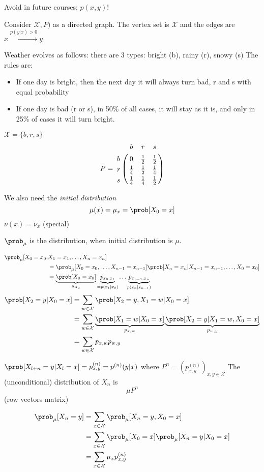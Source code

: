 \documentclass[mfit.tex]{subfiles}
\begin{document}
\begin{rem}
  Avoid in future courses: $p(x,y)$!
\end{rem}

Consider $\mathcal{X},P)$ as a directed graph. The vertex set is $\mathcal{X}$ and the edges are $x \overset{p(y|x)>0}{\to} y$

\begin{ex}
  Weather evolves as follows:
  there are 3 types: bright (b), rainy (r), snowy (s)
  The rules are:
  \begin{itemize}
    \item If one day is bright, then the next day it will always turn bad, r and s with equal probability
    \item If one day is bad (r or s), in 50\% of all cases, it will stay as it is, and only in 25\% of cases it will turn bright.
  \end{itemize}
  $\mathcal{X} = \{b,r,s\}$
  \begin{align*}
    P = 
    \bordermatrix{
    ~ & b & r & s \cr
    b & 0 & \frac{1}{2} & \frac{1}{2} \cr 
    r & \frac{1}{4} & \frac{1}{2} & \frac{1}{4} \cr
    s & \frac{1}{4} & \frac{1}{4} & \frac{1}{2} \cr
    }
  \end{align*}
\end{ex}

We also need the \emph{initial distribution} 
\[ \mu(x) = \mu_x = \prob[X_0 = x] \]
$\nu(x) = \nu_x$ (special)

$\prob_\mu$ is the distribution, when initial distribution is $\mu$.

\begin{align*}
  \prob_\mu[X_0 = x_0,&X_1=x_1,\dots,X_n=x_n] \\
  &= \prob_\mu[X_0 = x_0,\dots,X_{n-1}=x_{n-1}] \prob[X_n=x_n|X_{n-1}=x_{n-1},\dots,X_0=x_0] \\
  &= \underbrace{\prob[X_0=x_0]}_{\mu_{X_0}} \underbrace{p_{x_0,x_1}}_{=p(x_1|x_0)} \dots \underbrace{p_{x_{n-1},x_n}}_{p(x_n|x_{n-1})}
\end{align*}
\begin{align*}
  \prob[X_2=y|X_0=x] &= \sum_{w \in \mathcal{X}} \prob[X_2=y,X_1=w|X_0=x] \\
  &= \sum_{w \in \mathcal{X}} \underbrace{\prob[X_1=w|X_0=x]}_{p_{x,w}} \underbrace{\prob[X_2=y|X_1=w,X_0=x]}_{p_{w,y}} \\
  &= \sum_{w \in \mathcal{X}} p_{x,w} p_{w,y} 
\end{align*}

\begin{lemma}
  $\prob[X_{l+n}=y|X_l=x] = p_{x,y}^{(n)} = p^{(n)}(y|x)$ where $P^n = (p_{x,y}^{(n)})_{x,y \in \mathcal{X}}$
  The (unconditional) distribution of $X_n$ is 
  \[ \mu P^n \]
  (row vectors matrix)
\end{lemma}

\begin{align*}
  \prob_\mu[X_n=y] &= \sum_{x \in \mathcal{X}} \prob_\mu[X_n=y,X_0=x] \\
  &= \sum_{x \in \mathcal{X}} \prob_\mu[X_0=x] \prob_\mu[X_n=y|X_0=x] \\
  &= \sum_{x \in \mathcal{X}} \mu_x p_{x,y}^{(n)}
\end{align*}
\end{document}
